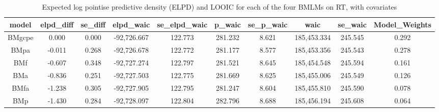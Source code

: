 \documentclass[
  11pt,
  english,
  ,doc,floatsintext]{apa6}
\begin{document}
\begin{table}[htb]

\begin{center}
\begin{threeparttable}

\caption{\label{tab:modelComp2RT}Expected log pointise predictive density (ELPD) and LOOIC for each of the four BMLMs on RT, with covariates}

\tiny{

\begin{tabular}{cccccccccc}
\toprule
model & \multicolumn{1}{c}{elpd\_diff} & \multicolumn{1}{c}{se\_diff} & \multicolumn{1}{c}{elpd\_waic} & \multicolumn{1}{c}{se\_elpd\_waic} & \multicolumn{1}{c}{p\_waic} & \multicolumn{1}{c}{se\_p\_waic} & \multicolumn{1}{c}{waic} & \multicolumn{1}{c}{se\_waic} & \multicolumn{1}{c}{Model\_Weights}\\
\midrule
BMgcpe & 0.000 & 0.000 & -92,726.667 & 122.773 & 281.232 & 8.621 & 185,453.334 & 245.545 & 0.292\\
BMpa & -0.011 & 0.268 & -92,726.678 & 122.772 & 281.177 & 8.577 & 185,453.356 & 245.543 & 0.278\\
BMf & -0.607 & 0.348 & -92,727.274 & 122.797 & 281.521 & 8.645 & 185,454.548 & 245.594 & 0.161\\
BMa & -0.836 & 0.251 & -92,727.503 & 122.775 & 281.669 & 8.625 & 185,455.006 & 245.549 & 0.126\\
BMfa & -1.238 & 0.305 & -92,727.905 & 122.795 & 281.247 & 8.604 & 185,455.810 & 245.590 & 0.078\\
BMp & -1.430 & 0.284 & -92,728.097 & 122.804 & 282.796 & 8.688 & 185,456.194 & 245.608 & 0.064\\
\bottomrule
\end{tabular}

}

\end{threeparttable}
\end{center}

\end{table}
\end{document}
